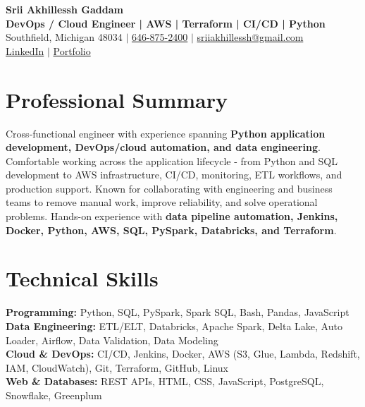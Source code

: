 \documentclass[letterpaper,10pt]{article}
\begin{document}
\fontsize{9.35pt}{10.45pt}\selectfont

\begin{center}
    {\LARGE \textbf{Srii Akhillessh Gaddam}} \\[-1pt]
    \textbf{DevOps / Cloud Engineer | AWS | Terraform | CI/CD | Python} \\[2pt]
    Southfield, Michigan 48034 $|$
    \href{tel:6468752400}{646-875-2400} $|$
    \href{mailto:sriiakhillessh@gmail.com}{sriiakhillessh@gmail.com} \\[1pt]
    \href{https://www.linkedin.com/in/srii-akhiilessh-gaddam-b48668191/}{LinkedIn} $|$
    \href{https://sriiakhillesshg.github.io/portfolio/}{Portfolio}
\end{center}
\vspace{-8pt}

\section{Professional Summary}
\small{Cross-functional engineer with experience spanning \textbf{Python application development, DevOps/cloud automation, and data engineering}. Comfortable working across the application lifecycle - from Python and SQL development to AWS infrastructure, CI/CD, monitoring, ETL workflows, and production support. Known for collaborating with engineering and business teams to remove manual work, improve reliability, and solve operational problems. Hands-on experience with \textbf{data pipeline automation, Jenkins, Docker, Python, AWS, SQL, PySpark, Databricks, and Terraform}.}

\section{Technical Skills}
\small{
\textbf{Programming:} Python, SQL, PySpark, Spark SQL, Bash, Pandas, JavaScript \\
\textbf{Data Engineering:} ETL/ELT, Databricks, Apache Spark, Delta Lake, Auto Loader, Airflow, Data Validation, Data Modeling \\
\textbf{Cloud \& DevOps:} CI/CD, Jenkins, Docker, AWS (S3, Glue, Lambda, Redshift, IAM, CloudWatch), Git, Terraform, GitHub, Linux \\
\textbf{Web \& Databases:} REST APIs, HTML, CSS, JavaScript, PostgreSQL, Snowflake, Greenplum
}
\end{document}
